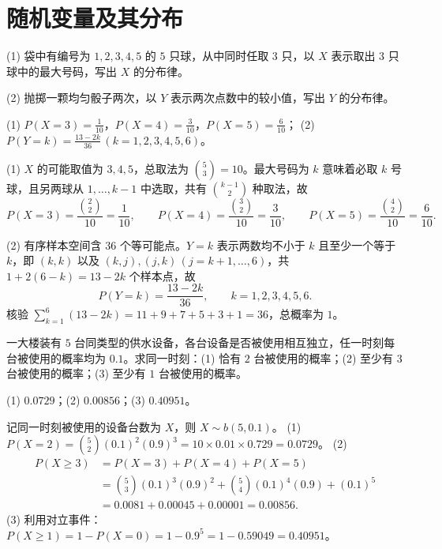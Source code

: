 %
%
\section{随机变量及其分布}

\begin{exercise}[title={离散型分布律的建立},level=basic,points=6,tags={分布律,古典概型}]
(1) 袋中有编号为 $1,2,3,4,5$ 的 $5$ 只球，从中同时任取 $3$ 只，以 $X$ 表示取出 $3$ 只球中的最大号码，写出 $X$ 的分布律。

(2) 抛掷一颗均匀骰子两次，以 $Y$ 表示两次点数中的较小值，写出 $Y$ 的分布律。
\begin{answer}
(1) $P(X=3)=\frac{1}{10}$，$P(X=4)=\frac{3}{10}$，$P(X=5)=\frac{6}{10}$；
(2) $P(Y=k)=\frac{13-2k}{36}\,(k=1,2,3,4,5,6)$。
\end{answer}
\begin{solution}
(1) $X$ 的可能取值为 $3,4,5$，总取法为 $\binom{5}{3}=10$。最大号码为 $k$ 意味着必取 $k$ 号球，且另两球从 $1,\ldots,k-1$ 中选取，共有 $\binom{k-1}{2}$ 种取法，故
\[
  P(X=3)=\frac{\binom{2}{2}}{10}=\frac{1}{10},\qquad
  P(X=4)=\frac{\binom{3}{2}}{10}=\frac{3}{10},\qquad
  P(X=5)=\frac{\binom{4}{2}}{10}=\frac{6}{10}.
\]

(2) 有序样本空间含 $36$ 个等可能点。$Y=k$ 表示两数均不小于 $k$ 且至少一个等于 $k$，即 $(k,k)$ 以及 $(k,j),(j,k)\,(j=k+1,\ldots,6)$，共 $1+2(6-k)=13-2k$ 个样本点，故
\[
  P(Y=k)=\frac{13-2k}{36},\qquad k=1,2,3,4,5,6.
\]
核验 $\sum_{k=1}^{6}(13-2k)=11+9+7+5+3+1=36$，总概率为 $1$。
\end{solution}
\end{exercise}

\begin{exercise}[title={二项分布的基本计算},level=basic,points=6,tags={二项分布}]
一大楼装有 $5$ 台同类型的供水设备，各台设备是否被使用相互独立，任一时刻每台被使用的概率均为 $0.1$。求同一时刻：(1) 恰有 $2$ 台被使用的概率；(2) 至少有 $3$ 台被使用的概率；(3) 至少有 $1$ 台被使用的概率。
\begin{answer}
(1) $0.0729$；(2) $0.00856$；(3) $0.40951$。
\end{answer}
\begin{solution}
记同一时刻被使用的设备台数为 $X$，则 $X\sim b(5,0.1)$。
(1) $P(X=2)=\binom{5}{2}(0.1)^2(0.9)^3=10\times 0.01\times 0.729=0.0729$。
(2)
\[
\begin{aligned}
  P(X\ge 3)&=P(X=3)+P(X=4)+P(X=5)\\
  &=\binom{5}{3}(0.1)^3(0.9)^2+\binom{5}{4}(0.1)^4(0.9)+(0.1)^5\\
  &=0.0081+0.00045+0.00001=0.00856.
\end{aligned}
\]
(3) 利用对立事件：$P(X\ge 1)=1-P(X=0)=1-0.9^5=1-0.59049=0.40951$。
\end{solution}
\end{exercise}

